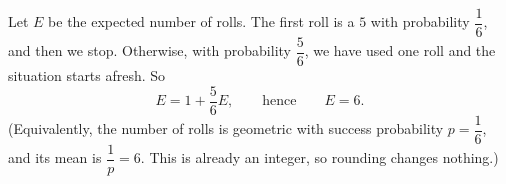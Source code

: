 Let $E$ be the expected number of rolls. The first roll is a $5$ with probability $\dfrac{1}{6}$, and then we stop. Otherwise, with probability $\dfrac{5}{6}$, we have used one roll and the situation starts afresh. So
\[
E=1+\dfrac{5}{6}E ,\qquad\text{hence}\qquad E=\boxed{6}.
\]
(Equivalently, the number of rolls is geometric with success probability $p=\dfrac{1}{6}$, and its mean is $\dfrac{1}{p}=6$. This is already an integer, so rounding changes nothing.)
